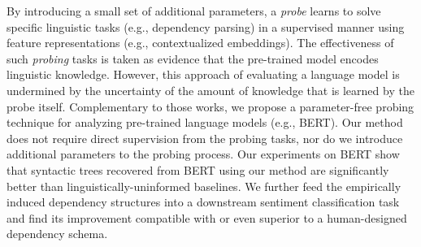 By introducing a small set of additional parameters, a {\it probe} learns to solve specific linguistic tasks (e.g., dependency parsing) in a supervised manner using feature representations (e.g., contextualized embeddings). The effectiveness of such {\it probing} tasks is taken as evidence that the pre-trained model encodes linguistic knowledge. However, this approach of evaluating a language model is undermined by the uncertainty of the amount of knowledge that is learned by the probe itself. Complementary to those works, we propose a parameter-free probing technique for analyzing pre-trained language models (e.g., BERT). Our method does not require direct supervision from the probing tasks, nor do we introduce additional parameters to the probing process. Our experiments on BERT show that syntactic trees recovered from BERT using our method are significantly better than linguistically-uninformed baselines. We further feed the empirically induced dependency structures into a downstream sentiment classification task and find its improvement compatible with or even superior to a human-designed dependency schema.
